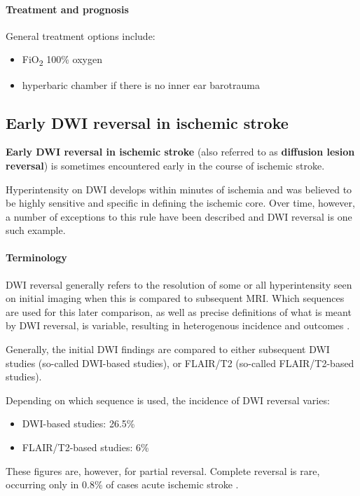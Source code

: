 \paragraph{Treatment and prognosis}

General treatment options include:

\begin{itemize}
	\item
	FiO\textsubscript{2} 100\% oxygen
	\item
	hyperbaric chamber if there is no inner ear barotrauma
\end{itemize}
\subsection{Early DWI reversal in ischemic stroke}

\textbf{Early DWI reversal in ischemic stroke} (also referred to as \textbf{diffusion lesion reversal}) is sometimes encountered early in the course of ischemic stroke.

Hyperintensity on DWI develops within minutes of ischemia and was believed to be highly sensitive and specific in defining the ischemic core. Over time, however, a number of exceptions to this rule have been described and DWI reversal is one such example.

\paragraph{Terminology}

DWI reversal generally refers to the resolution of some or all hyperintensity seen on initial imaging when this is compared to subsequent MRI. Which sequences are used for this later comparison, as well as precise definitions of what is meant by DWI reversal, is variable, resulting in heterogenous incidence and outcomes .

Generally, the initial DWI findings are compared to either subsequent DWI studies (so-called DWI-based studies), or FLAIR/T2 (so-called FLAIR/T2-based studies).

Depending on which sequence is used, the incidence of DWI reversal varies:

\begin{itemize}
	\item
	DWI-based studies: 26.5\% 
	\item
	FLAIR/T2-based studies: 6\% 
\end{itemize}

These figures are, however, for partial reversal. Complete reversal is rare, occurring only in 0.8\% of cases acute ischemic stroke .

